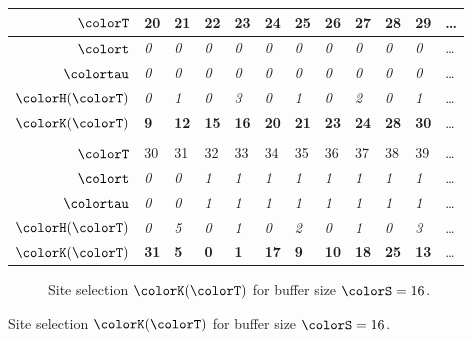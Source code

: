 \begin{figure}[htbp!]
\begin{minipage}{\linewidth}
\begin{tabularx}{\linewidth}{@{}r|*{11}{Y}@{}}
  { $\colorT$} &
    {20} & {21} & {22} & {23} & {24}
    & {25} & {26} & {27} & {28} & {29} & \ldots \\ \hline
  { $\colort$} &
    \textit{0} & \textit{0} & \textit{0} & \textit{0} & \textit{0} & \textit{0} & \textit{0} & \textit{0} & \textit{0} & \textit{0} & \ldots \\
  { $\colortau$} &
    \textit{0} & \textit{0} & \textit{0} & \textit{0} & \textit{0} & \textit{0} & \textit{0} & \textit{0} & \textit{0} & \textit{0} & \ldots \\
  { $\colorH(\colorT)$} &
    \textit{0} & \textit{1} & \textit{0} & \textit{3} & \textit{0} & \textit{1} & \textit{0} & \textit{2} & \textit{0} & \textit{1} & \ldots \\
  { $\colorK(\colorT)$} &
    \textbf{9} & \textbf{12} & \textbf{15} & \textbf{16} & \textbf{20}
    & \textbf{21} & \textbf{23} & \textbf{24} & \textbf{28} & \textbf{30} & \ldots \\
   \\[1ex]

  { $\colorT$} &
    {30} & {31} & {32} & {33} & {34}
    & {35} & {36} & {37} & {38} & {39} & \ldots \\ \hline
  { $\colort$} &
    \textit{0} & \textit{0} & \textit{1} & \textit{1} & \textit{1} & \textit{1} & \textit{1} & \textit{1} & \textit{1} & \textit{1} & \ldots \\
  { $\colortau$} &
    \textit{0} & \textit{0} & \textit{1} & \textit{1} & \textit{1} & \textit{1} & \textit{1} & \textit{1} & \textit{1} & \textit{1} & \ldots \\
  { $\colorH(\colorT)$} &
    \textit{0} & \textit{5} & \textit{0} & \textit{1} & \textit{0} & \textit{2} & \textit{0} & \textit{1} & \textit{0} & \textit{3} & \ldots \\
  { $\colorK(\colorT)$} &
    \textbf{31} & \textbf{5} & \textbf{0} & \textbf{1} & \textbf{17}
    & \textbf{9} & \textbf{10} & \textbf{18} & \textbf{25} & \textbf{13} & \ldots \\

  \end{tabularx}
  \vspace{-2ex}
\end{minipage}


\begin{subfigure}{\linewidth}
\caption{\footnotesize Site selection $\colorK(\colorT)$ for buffer size $\colorS=16$.}
\label{fig:hsurf-tilted-implementation-site-selection}
\end{subfigure}
\vspace{-3ex}


\end{figure}
